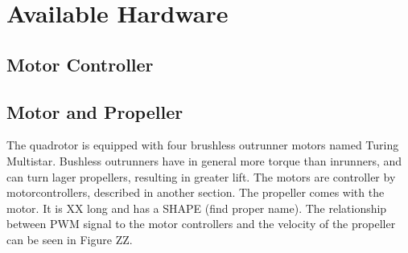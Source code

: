 \section{Available Hardware}

\subsection{Motor Controller}



\subsection{Motor and Propeller}
The quadrotor is equipped with four brushless outrunner motors named Turing Multistar. Bushless outrunners have in general more torque than inrunners, and can turn lager propellers, resulting in greater lift. The motors are controller by motorcontrollers, described in another section. The propeller comes with the motor. It is XX long and has a SHAPE (find proper name). 
The relationship between PWM signal to the motor controllers and the velocity of the propeller can be seen in Figure ZZ. 

